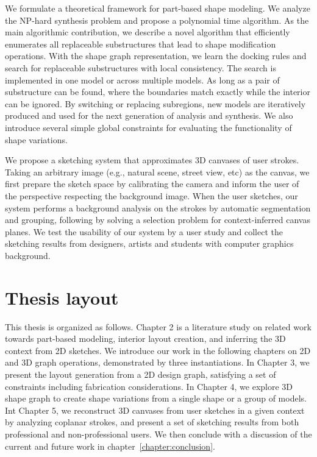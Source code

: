 We formulate a theoretical framework for part-based shape modeling. We analyze the NP-hard synthesis problem and propose a polynomial time algorithm. As the main algorithmic contribution, we describe a novel algorithm that efficiently enumerates all replaceable substructures that lead to shape modification operations. With the shape graph representation, we learn the docking rules and search for replaceable substructures with local consistency. The search is implemented in one model or across multiple models. As long as a pair of substructure can be found, where the boundaries match exactly while the interior can be ignored. By switching or replacing subregions, new models are iteratively produced and used for the next generation of analysis and synthesis. We also introduce several simple global constraints for evaluating the functionality of shape variations.

We propose a sketching system that approximates 3D canvases of user strokes. Taking an arbitrary image (e.g., natural scene, street view, etc) as the canvas, we first prepare the sketch space by calibrating the camera and inform the user of the perspective respecting the background image. When the user sketches, our system performs a background analysis on the strokes by automatic segmentation and grouping, following by solving a selection problem for context-inferred canvas planes. We test the usability of our system by a user study and collect the sketching results from designers, artists and students with computer graphics background.

\section{Thesis layout}

This thesis is organized as follows. Chapter 2 is a literature study on related work towards part-based modeling, interior layout creation, and inferring the 3D context from 2D sketches. We introduce our work in the following chapters on 2D and 3D graph operations, demonstrated by three instantiations. In Chapter 3, we present the layout generation from a 2D design graph, satisfying a set of constraints including fabrication considerations. In Chapter 4, we explore 3D shape graph to create shape variations from a single shape or a group of models. Int Chapter 5, we reconstruct 3D canvases from user sketches in a given context by analyzing coplanar strokes, and present a set of sketching results from both professional and non-professional users. We then conclude with a discussion of the current and future work in chapter~\ref{chapter:conclusion}.
